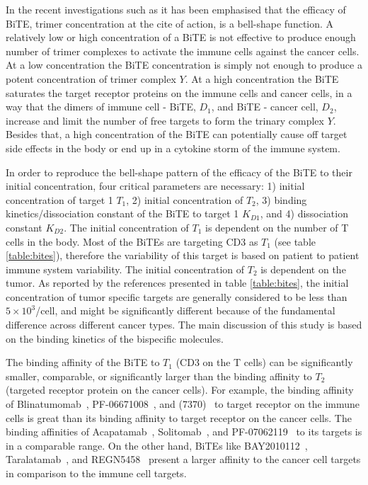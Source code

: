In the recent investigations such as \cite{betts2019translational,douglass2013comprehensive} it has been emphasised that the efficacy of \ac{BiTE}, trimer concentration at the cite of action, is a bell-shape function. A relatively low or high concentration of a \ac{BiTE} is not effective to produce enough number of trimer complexes to activate the immune cells against the cancer cells. At a low concentration the \ac{BiTE} concentration is simply not enough to produce a potent concentration of trimer complex $Y$. At a high concentration the \ac{BiTE} saturates the target receptor proteins on the immune cells and cancer cells, in a way that the dimers of immune cell - \ac{BiTE}, $D_1$, and \ac{BiTE} - cancer cell, $D_2$, increase and limit the number of free targets to form the trinary complex $Y$. 
Besides that, a high concentration of the \ac{BiTE} can potentially cause off target side effects in the body or end up in a cytokine storm of the immune system. 

In order to reproduce the bell-shape pattern of the efficacy of the \ac{BiTE} to their initial concentration, four critical parameters are necessary: 1) initial concentration of target 1 $T_1$, 2) initial concentration of $T_2$, 3) binding kinetics/dissociation constant of the \ac{BiTE} to target 1 $K_{D1}$, and 4) dissociation constant $K_{D2}$. The initial concentration of $T_1$ is dependent on the number of T cells in the body. Most of the \ac{BiTE}s are targeting CD3 as $T_1$ (see table \ref{table:bites}), therefore the variability of this target is based on patient to patient immune system variability. The initial concentration of $T_2$ is dependent on the tumor. As reported by the references presented in table \ref{table:bites}, the initial concentration of tumor specific targets are generally considered to be less than $5\times10^3$/cell, and might be significantly different because of the fundamental difference across different cancer types. The main discussion of this study is based on the binding kinetics of the bispecific molecules.

The binding affinity of the \ac{BiTE} to $T_1$ (CD3 on the T cells) can be significantly smaller, comparable, or significantly larger than the binding affinity to $T_2$ (targeted receptor protein on the cancer cells). For example, the binding affinity of Blinatumomab~\cite{dreier2002extremely}, PF-06671008~\cite{root2016development}, and (7370)~\cite{yeung2020optimized} to target receptor on the immune cells is great than its binding affinity to target receptor on the cancer cells. The binding affinities of Acapatamab~\cite{deegen2021psma}, Solitomab~\cite{brischwein2006mt110}, and PF-07062119~\cite{mathur2020novel} to its targets is in a comparable range. On the other hand, \ac{BiTE}s like BAY2010112~\cite{friedrich2012regression}, Taralatamab~\cite{giffin2021amg}, and REGN5458~\cite{smith2020bispecific} present a larger affinity to the cancer cell targets in comparison to the immune cell targets.

